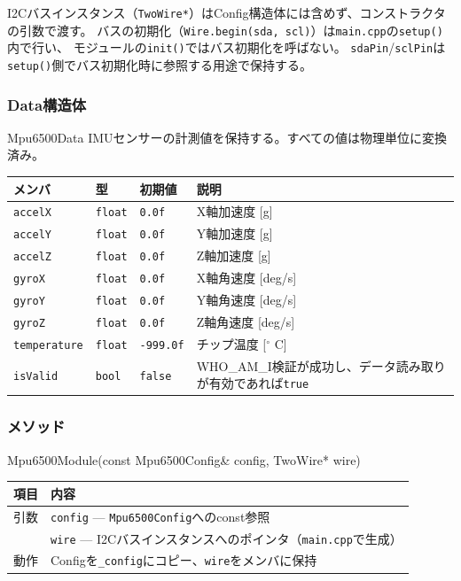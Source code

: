 \begin{notebox}[I2Cバス注入パターン]
I2Cバスインスタンス（\texttt{TwoWire*}）はConfig構造体には含めず、コンストラクタの引数で渡す。
バスの初期化（\texttt{Wire.begin(sda, scl)}）は\texttt{main.cpp}の\texttt{setup()}内で行い、
モジュールの\texttt{init()}ではバス初期化を呼ばない。
\texttt{sdaPin}/\texttt{sclPin}は\texttt{setup()}側でバス初期化時に参照する用途で保持する。
\end{notebox}

\subsubsection{Data構造体}

\begin{funcblock}{Mpu6500Data}
IMUセンサーの計測値を保持する。すべての値は物理単位に変換済み。

\begin{longtable}{l l l p{4.8cm}}
\toprule
\textbf{メンバ} & \textbf{型} & \textbf{初期値} & \textbf{説明} \\
\midrule
\endhead
\texttt{accelX}      & \texttt{float} & \texttt{0.0f}     & X軸加速度 [g] \\
\texttt{accelY}      & \texttt{float} & \texttt{0.0f}     & Y軸加速度 [g] \\
\texttt{accelZ}      & \texttt{float} & \texttt{0.0f}     & Z軸加速度 [g] \\
\texttt{gyroX}       & \texttt{float} & \texttt{0.0f}     & X軸角速度 [deg/s] \\
\texttt{gyroY}       & \texttt{float} & \texttt{0.0f}     & Y軸角速度 [deg/s] \\
\texttt{gyroZ}       & \texttt{float} & \texttt{0.0f}     & Z軸角速度 [deg/s] \\
\texttt{temperature} & \texttt{float} & \texttt{-999.0f}  & チップ温度 [$^{\circ}$ C] \\
\texttt{isValid}     & \texttt{bool}  & \texttt{false}    & WHO\_AM\_I検証が成功し、データ読み取りが有効であれば\texttt{true} \\
\bottomrule
\end{longtable}
\end{funcblock}

\subsubsection{メソッド}

\begin{funcblock}{Mpu6500Module(const Mpu6500Config\& config, TwoWire* wire)}
\begin{tabularx}{\textwidth}{l X}
\toprule
\textbf{項目} & \textbf{内容} \\
\midrule
引数   & \texttt{config} --- \texttt{Mpu6500Config}へのconst参照 \\
       & \texttt{wire} --- I2Cバスインスタンスへのポインタ（\texttt{main.cpp}で生成） \\
動作   & Configを\texttt{\_config}にコピー、\texttt{wire}をメンバに保持 \\
\bottomrule
\end{tabularx}
\end{funcblock}

